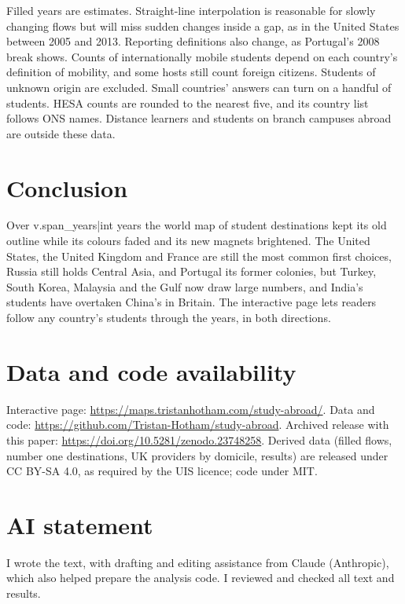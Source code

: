 \documentclass[11pt,a4paper]{article}
\begin{document}
Filled years are estimates. Straight-line interpolation is reasonable for slowly changing flows but will miss sudden changes inside a gap, as in the United States between 2005 and 2013. Reporting definitions also change, as Portugal's 2008 break shows. Counts of internationally mobile students depend on each country's definition of mobility, and some hosts still count foreign citizens. Students of unknown origin are excluded. Small countries' answers can turn on a handful of students. HESA counts are rounded to the nearest five, and its country list follows ONS names. Distance learners and students on branch campuses abroad are outside these data.

\section{Conclusion}

Over {{v.span_years|int}} years the world map of student destinations kept its old outline while its colours faded and its new magnets brightened. The United States, the United Kingdom and France are still the most common first choices, Russia still holds Central Asia, and Portugal its former colonies, but Turkey, South Korea, Malaysia and the Gulf now draw large numbers, and India's students have overtaken China's in Britain. The interactive page lets readers follow any country's students through the years, in both directions.

\section*{Data and code availability}

Interactive page: \url{https://maps.tristanhotham.com/study-abroad/}. Data and code: \url{https://github.com/Tristan-Hotham/study-abroad}. Archived release with this paper: \url{https://doi.org/10.5281/zenodo.23748258}. Derived data (filled flows, number one destinations, UK providers by domicile, results) are released under CC BY-SA 4.0, as required by the UIS licence; code under MIT.

\section*{AI statement}

I wrote the text, with drafting and editing assistance from Claude (Anthropic), which also helped prepare the analysis code. I reviewed and checked all text and results.
\end{document}
